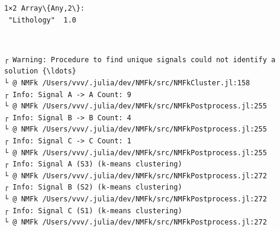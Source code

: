 \documentclass[11pt]{article}
\begin{document}
    \begin{Verbatim}[commandchars=\\\{\}]
1×2 Array\{Any,2\}:
 "Lithology"  1.0
    \end{Verbatim}


    \begin{center}
    \end{center}
    { \hspace*{\fill} \\}

    \begin{Verbatim}[commandchars=\\\{\}]
┌ Warning: Procedure to find unique signals could not identify a solution {\ldots}
└ @ NMFk /Users/vvv/.julia/dev/NMFk/src/NMFkCluster.jl:158
┌ Info: Signal A -> A Count: 9
└ @ NMFk /Users/vvv/.julia/dev/NMFk/src/NMFkPostprocess.jl:255
┌ Info: Signal B -> B Count: 4
└ @ NMFk /Users/vvv/.julia/dev/NMFk/src/NMFkPostprocess.jl:255
┌ Info: Signal C -> C Count: 1
└ @ NMFk /Users/vvv/.julia/dev/NMFk/src/NMFkPostprocess.jl:255
┌ Info: Signal A (S3) (k-means clustering)
└ @ NMFk /Users/vvv/.julia/dev/NMFk/src/NMFkPostprocess.jl:272
┌ Info: Signal B (S2) (k-means clustering)
└ @ NMFk /Users/vvv/.julia/dev/NMFk/src/NMFkPostprocess.jl:272
┌ Info: Signal C (S1) (k-means clustering)
└ @ NMFk /Users/vvv/.julia/dev/NMFk/src/NMFkPostprocess.jl:272
    \end{Verbatim}

    \begin{center}
    \end{center}
    { \hspace*{\fill} \\}

    \begin{Verbatim}[commandchars=\\\{\}]

    \end{Verbatim}

    \begin{center}
    \end{center}
    { \hspace*{\fill} \\}

    \begin{center}
    \end{center}
    { \hspace*{\fill} \\}
\end{document}
